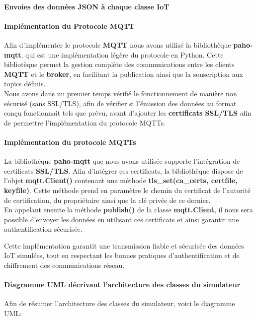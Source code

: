 \documentclass[10pt, a4paper]{report}
\begin{document}
	\paragraph{Envoies des données JSON à chaque classe IoT}

	\paragraph{Implémentation du Protocole MQTT} Afin d'implémenter le protocole \textbf{MQTT} nous avons utilisé la bibliothèque \textbf{paho-mqtt}, qui est une implémentation légère du protocole en Python. Cette bibliotèque permet la gestion complète des communications entre les clients \textbf{MQTT} et le \textbf{broker}, en facilitant la publication ainsi que la souscription aux topics définis.\\
	Nous avons dans un premier temps vérifié le fonctionnement de manière non sécurisé (sans SSL/TLS), afin de vérifier si l'émission des données au format conçu fonctionnait tels que prévu, avant d'ajouter les \textbf{certificats SSL/TLS} afin de permettre l'implémentation du protocole MQTTs. 

	
	\paragraph{Implémentation du protocole MQTTs} La bibliothèque \textbf{paho-mqtt} que nous avons utilisée supporte l'intégration de certificats \textbf{SSL/TLS}. Afin d'intégrer ces certificats, la bibliothèque dispose de l'objet \textbf{mqtt.Client()} contenant une méthode \textbf{tls\_set(ca\_certs, certfile, keyfile)}. Cette méthode prend en paramètre le chemin du certificat de l'autorité de certification, du propriétaire ainsi que la clé privée de ce dernier.\\
	En appelant ensuite la méthode \textbf{publish()} de la classe \textbf{mqtt.Client}, il nous sera possible d'envoyer les données en utilisant ces certificats et ainsi garantir une authentification sécurisée.
	
	Cette implémentation garantit une transmission fiable et sécurisée des données IoT simulées, tout en respectant les bonnes pratiques d’authentification et de chiffrement des communications réseau.
	
	\paragraph{Diagramme UML décrivant l'architecture des classes du simulateur} Afin de résumer l'architecture des classes du simulateur, voici le diagramme UML:
\end{document}
